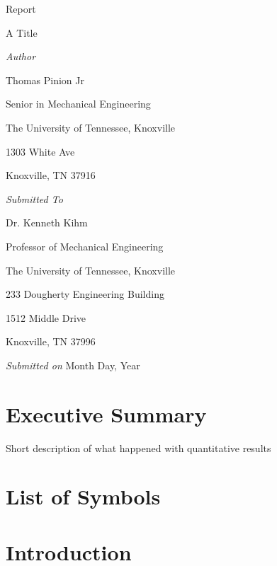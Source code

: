 \documentclass{article}
\begin{document}
\begin{center}
Report								%
\end{center}

\hrulefill

\begin{center}
\huge{A Title}							%
\end{center}

\hrulefill
\vspace{0.5in}
\begin{center}
\emph{Author}

Thomas Pinion Jr

Senior in Mechanical Engineering

The University of Tennessee, Knoxville

1303 White Ave

Knoxville, TN 37916

\vspace{1in}
\emph{Submitted To}

Dr. Kenneth Kihm

Professor of Mechanical Engineering

The University of Tennessee, Knoxville

233 Dougherty Engineering Building

1512 Middle Drive

Knoxville, TN 37996

\vspace*{\fill}

\emph{Submitted on}
Month Day, Year							%

\end{center}

\newpage
\section*{Executive Summary}
Short description of what happened with quantitative results


\newpage
\tableofcontents

\newpage
\section*{List of Symbols}

\newpage
\section{Introduction}
\end{document}
